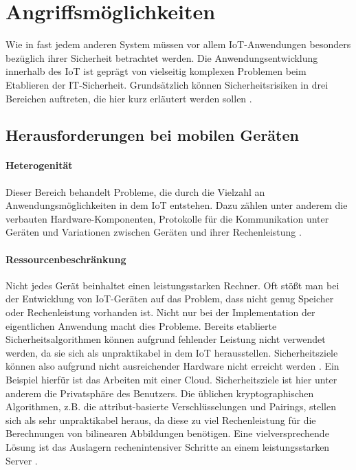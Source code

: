 \section{Angriffsmöglichkeiten}\label{sec:possible-attacks}
Wie in fast jedem anderen System müssen vor allem IoT-Anwendungen besonders
bezüglich ihrer Sicherheit betrachtet werden. Die Anwendungsentwicklung
innerhalb des IoT ist geprägt von vielseitig komplexen Problemen beim Etablieren
der IT-Sicherheit. Grundsätzlich können Sicherheitsrisiken in drei Bereichen
auftreten, die hier kurz erläutert werden sollen \cite{paper}.

\subsection{Herausforderungen bei mobilen Geräten}
\paragraph{Heterogenität}
Dieser Bereich behandelt Probleme, die durch die Vielzahl an
Anwendungsmöglichkeiten in dem IoT entstehen. Dazu zählen unter anderem
die verbauten Hardware-Komponenten, Protokolle für die Kommunikation unter
Geräten und Variationen zwischen Geräten und ihrer Rechenleistung \cite{paper}.

\paragraph{Ressourcenbeschränkung}
Nicht jedes Gerät beinhaltet einen leistungsstarken Rechner. Oft stößt man bei
der Entwicklung von IoT-Geräten auf das Problem, dass nicht genug Speicher oder
Rechenleistung vorhanden ist. Nicht nur bei der Implementation der eigentlichen
Anwendung macht dies Probleme. Bereits etablierte Sicherheitsalgorithmen können
aufgrund fehlender Leistung nicht verwendet werden, da sie sich als
unpraktikabel in dem IoT herausstellen. Sicherheitsziele können also aufgrund
nicht ausreichender Hardware nicht erreicht werden \cite{paper}. Ein Beispiel
hierfür ist das Arbeiten mit einer Cloud. Sicherheitsziele ist hier unter
anderem die Privatsphäre des Benutzers. Die üblichen kryptographischen
Algorithmen, z.B. die attribut-basierte Verschlüsselungen und Pairings, stellen
sich als sehr unpraktikabel heraus, da diese zu viel Rechenleistung für die
Berechnungen von bilinearen Abbildungen benötigen. Eine vielversprechende Lösung
ist das Auslagern rechenintensiver Schritte an einem leistungsstarken Server
\cite{phoabe}.

